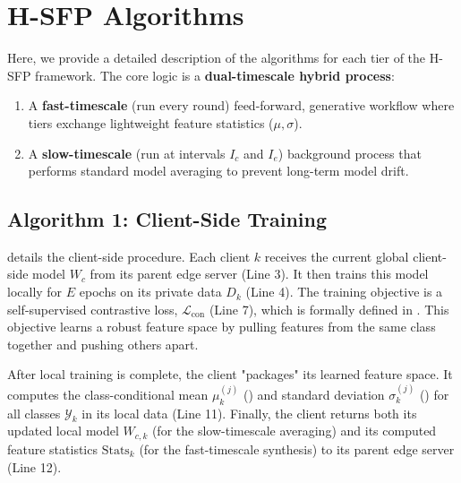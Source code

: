 \section{H-SFP Algorithms}
\label{app:algorithm}
Here, we provide a detailed description of the algorithms for each tier of the H-SFP framework. The core logic is a \textbf{dual-timescale hybrid process}:
\begin{enumerate}
    \item A \textbf{fast-timescale} (run every round) feed-forward, generative workflow where tiers exchange lightweight feature statistics ($\mu, \sigma$).
    \item A \textbf{slow-timescale} (run at intervals $I_c$ and $I_e$) background process that performs standard model averaging to prevent long-term model drift.
\end{enumerate}

\subsection*{Algorithm 1: Client-Side Training}
 details the client-side procedure. Each client $k$ receives the current global client-side model $W_c$ from its parent edge server (Line 3). It then trains this model locally for $E$ epochs on its private data $D_k$ (Line 4). The training objective is a self-supervised contrastive loss, $\mathcal{L}_{\text{con}}$ (Line 7), which is formally defined in . This objective learns a robust feature space by pulling features from the same class together and pushing others apart.

After local training is complete, the client "packages" its learned feature space. It computes the class-conditional mean $\mu_k^{(j)}$ () and standard deviation $\sigma_k^{(j)}$ () for all classes $\mathcal{Y}_k$ in its local data (Line 11). Finally, the client returns both its updated local model $W_{c,k}$ (for the slow-timescale averaging) and its computed feature statistics $\text{Stats}_k$ (for the fast-timescale synthesis) to its parent edge server (Line 12).

